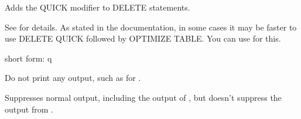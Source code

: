 \documentclass[letterpaper,10pt,english]{sphinxmanual}
\begin{document}
\begin{fulllineitems}
\label{\detokenize{mariadb-archiver:cmdoption-mariadb-archiver-quick-delete}}
Adds the QUICK modifier to DELETE statements.

See  for details.  As stated in the
documentation, in some cases it may be faster to use DELETE QUICK followed by
OPTIMIZE TABLE.  You can use {\hyperref[\detokenize{mariadb-archiver:cmdoption-mariadb-archiver-optimize}]{}} for this.

\end{fulllineitems}


\begin{fulllineitems}
\label{\detokenize{mariadb-archiver:cmdoption-mariadb-archiver-quiet}}
short form: \sphinxhyphen{}q

Do not print any output, such as for {\hyperref[\detokenize{mariadb-archiver:cmdoption-mariadb-archiver-statistics}]{}}.

Suppresses normal output, including the output of {\hyperref[\detokenize{mariadb-archiver:cmdoption-mariadb-archiver-statistics}]{}}, but doesn’t
suppress the output from {\hyperref[\detokenize{mariadb-archiver:cmdoption-mariadb-archiver-why-quit}]{}}.

\end{fulllineitems}

\end{document}
